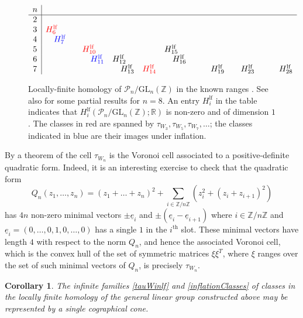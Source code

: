 \documentclass[10pt]{amsart}
\newcommand{\RR}{{\mathbb R}}
\newcommand{\ZZ}{{\mathbb Z}}
\newcommand{\eee}{{\underline{e}}}
\theoremstyle{plain}
\newtheorem{cor}[thm]{Corollary}
\newcommand{\GL}{\mathrm{GL}}
\newcommand{\lf}{\mathrm{lf}}
\newcommand{\0}{\color{blue}{\mathsf{0}}}
\begin{document}
\begin{figure}[h]
\[
\begin{array}{c|cccccccccccccccccc}
n    & 
 \\ \hline
2  &         \\
 3 &  \color{red}{H^{\lf}_6} \quad    \\
 4 &   \quad \color{blue}{H^{\lf}_7}    \\ 
 5 &   & & \color{red}{H^{\lf}_{10}}  \quad   & & &   H^{\lf}_{15} \quad   \\ 
 6 &    & &  \quad \color{blue}{H^{\lf}_{11}} & H^{\lf}_{12} \quad  & &\quad  H^{\lf}_{16}  \\ 
 7 &   & &   &  \quad  H^{\lf}_{13} & \color{red}{H^{\lf}_{14}} &&& &   H^{\lf}_{19} & & H^{\lf}_{23} & && H^{\lf}_{28}  \\ 
\end{array}
\]
\caption{Locally-finite homology of $\mathcal{P}_n/\GL_n(\ZZ)$ in the known ranges  \cite{SouleSL3, LeeSzczarba, ElbazVincentGanglSoule}. See also \cite{GL8} for some partial results for $n=8$. An entry $H^{\lf}_i$ in the table  indicates that $H^{\lf}_i(\mathcal{P}_n/\GL_n(\ZZ);\RR)$ is non-zero and of dimension $1$.  The classes in red are spanned by $\tau_{W_3}, \tau_{W_5}, \tau_{W_7},\ldots $;  the classes indicated in blue are their images under inflation. }\label{fig:2}
\end{figure}




By a theorem of \cite{AlexeevBrunyate, MeloViviani} the cell $\tau_{W_n}$ is the Voronoi cell associated to a positive-definite quadratic form.
Indeed, it is an interesting  exercise to check that  the quadratic form
\begin{equation} 
Q_n (z_1,\ldots, z_n)= (z_1+\ldots + z_n)^2 + \sum_{i\in \ZZ/n\ZZ} \left(z_i^2 + (z_i+z_{i+1})^2\right)
\end{equation}
has $4n$ non-zero minimal vectors $\pm\eee_i$ and $\pm (\eee_i-\eee_{i+1})$ where $i\in \ZZ/n\ZZ$ and $\eee_i=(0,\ldots, 0, 1, 0,\ldots, 0)$ has a single $1$ in the $i^{\mathrm{th}}$ slot. These minimal vectors have length $4$ with respect to the norm $Q_n$,   and hence the associated Voronoi cell, which is the convex hull of the set of symmetric matrices $\xi\xi^T$, where $\xi$ ranges over  the set of  such minimal vectors of $Q_n$,  is precisely $\tau_{W_n}$. 

\begin{cor} The infinite families \eqref{tauWinlf} and \eqref{inflationClasses} of classes in the locally finite homology of the general linear group constructed above may be represented by a  single cographical cone.  
\end{cor}
\end{document}
